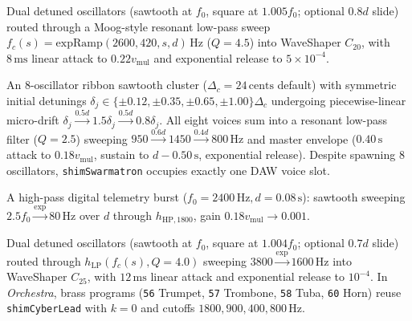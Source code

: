\begin{definition}
Dual detuned oscillators (sawtooth at $f_0$, square at $1.005 f_0$; optional $0.8d$ slide) routed through a Moog-style resonant low-pass sweep $f_c(s) = \mathrm{expRamp}(2600, 420, s, d)\,\text{Hz}$ ($Q = 4.5$) into WaveShaper $C_{20}$, with $8\,\text{ms}$ linear attack to $0.22 v_{\mathrm{mul}}$ and exponential release to $5\times 10^{-4}$.
\end{definition}

\begin{definition}
An 8-oscillator ribbon sawtooth cluster ($\Delta_c = 24\,\text{cents}$ default) with symmetric initial detunings $\delta_j \in \{\pm 0.12, \pm 0.35, \pm 0.65, \pm 1.00\}\Delta_c$ undergoing piecewise-linear micro-drift $\delta_j \xrightarrow{0.5d} 1.5\delta_j \xrightarrow{0.5d} 0.8\delta_j$. All eight voices sum into a resonant low-pass filter ($Q = 2.5$) sweeping $950 \xrightarrow{0.6d} 1450 \xrightarrow{0.4d} 800\,\text{Hz}$ and master envelope ($0.40\,\text{s}$ attack to $0.18 v_{\mathrm{mul}}$, sustain to $d - 0.50\,\text{s}$, exponential release). Despite spawning 8 oscillators, \texttt{shimSwarmatron} occupies exactly one DAW voice slot.
\end{definition}

\begin{definition}
A high-pass digital telemetry burst ($f_0 = 2400\,\text{Hz}, d = 0.08\,\text{s}$): sawtooth sweeping $2.5 f_0 \xrightarrow{\exp} 80\,\text{Hz}$ over $d$ through $h_{\mathrm{HP}, 1800}$, gain $0.18 v_{\mathrm{mul}} \to 0.001$.
\end{definition}

\begin{definition}
Dual detuned oscillators (sawtooth at $f_0$, square at $1.004 f_0$; optional $0.7d$ slide) routed through $h_{\mathrm{LP}}(f_c(s), Q = 4.0)$ sweeping $3800 \xrightarrow{\exp} 1600\,\text{Hz}$ into WaveShaper $C_{25}$, with $12\,\text{ms}$ linear attack and exponential release to $10^{-4}$. In \emph{Orchestra}, brass programs (\texttt{56} Trumpet, \texttt{57} Trombone, \texttt{58} Tuba, \texttt{60} Horn) reuse \texttt{shimCyberLead} with $k = 0$ and cutoffs $1800, 900, 400, 800\,\text{Hz}$.
\end{definition}

